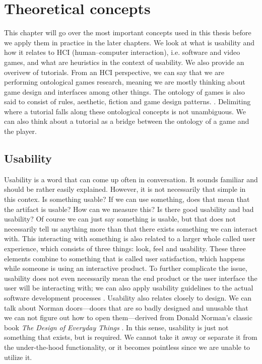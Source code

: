 \chapter{Theoretical concepts}

This chapter will go over the most important concepts used in this thesis before we apply them in practice in the later chapters. We look at what is usability and how it relates to HCI (human--computer interaction), i.e. software and video games, and what are heuristics in the context of usability. We also provide an overivew of tutorials. From an HCI perspective, we can say that we are performing ontological games research, meaning we are mostly thinking about game design and interfaces among other things. The ontology of games is also said to consist of rules, aesthetic, fiction and game design patterns. \cite{Carter2014}. Delimiting where a tutorial falls along these ontological concepts is not unambiguous. We can also think about a tutorial as a bridge between the ontology of a game and the player.

\section{Usability}
Usability is a word that can come up often in conversation. It sounds familiar and should be rather easily explained. However, it is not necessarily that simple in this contex. Is something usable? If we can use something, does that mean that the artifact is usable? How can we measure this? Is there good usability and bad usability? Of course we can just say something is usable, but that does not necessarily tell us anything more than that there exists something we can interact with. This interacting with something is also related to a larger whole called user experience, which consists of three things: look, feel and usability. These three elements combine to something that is called user satisfaction, which happens while someone is using an interactive product. \cite{Lipp2012} To further complicate the issue, usability does not even necessarily mean the end product or the user interface the user will be interacting with; we can also apply usability guidelines to the actual software development processes \cite{Carvajal2013}. Usability also relates closely to design. We can talk about Norman doors---doors that are so badly designed and unusable that we can not figure out how to open them---derived from Donald Norman's classic book \textit{The Design of Everyday Things} \cite{Norman2013a}. In this sense, usability is just not something that exists, but is required. We cannot take it away or separate it from the under-the-hood functionality, or it becomes pointless since we are unable to utilize it. 

